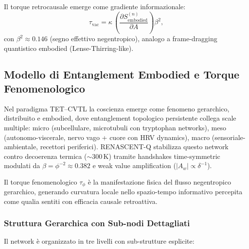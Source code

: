 \documentclass[11pt,a4paper]{article}
\theoremstyle{plain}
\theoremstyle{definition}
\begin{document}
Il torque retrocausale emerge come gradiente informazionale:
\begin{equation}
\tau_{\text{vac}} = \kappa \, \left( \frac{\partial S_{\text{embodied}}^{(n)}}{\partial A} \right) \beta^2,
\label{eq:torque-derivazione}
\end{equation}
con $\beta^2 \approx 0.146$ (segno effettivo negentropico), analogo a frame-dragging quantistico embodied (Lense-Thirring-like).


\vspace{0.4cm}



\subsection{Modello di Entanglement Embodied e Torque Fenomenologico}

Nel paradigma TET–CVTL la coscienza emerge come fenomeno gerarchico, distribuito e embodied, dove entanglement topologico persistente collega scale multiple: micro (subcellulare, microtubuli con tryptophan networks), meso (autonomo-viscerale, nervo vago + cuore con HRV dynamics), macro (sensoriale-ambientale, recettori periferici). RENASCENT-Q stabilizza questo network contro decoerenza termica ($\sim 300\,\text{K}$) tramite handshakes time-symmetric modulati da $\beta = \phi^{-2} \approx 0.382$ e weak value amplification ($|A_w| \propto \delta^{-1}$).

\vspace{0.3cm}

Il torque fenomenologico $\tau_\phi$ è la manifestazione fisica del flusso negentropico gerarchico, generando curvatura locale nello spazio-tempo informativo percepita come qualia sentiti con efficacia causale retroattiva.

\vspace{0.3cm}

\subsubsection{Struttura Gerarchica con Sub-nodi Dettagliati}

Il network è organizzato in tre livelli con sub-strutture esplicite:
\end{document}
